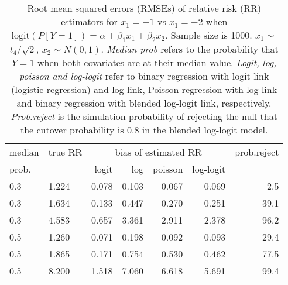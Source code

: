 \documentclass[12pt,a4paper]{article}
\begin{document}
\begin{table}[H] 
\small\sf\centering 
\caption{Root mean squared errors (RMSEs) of relative risk (RR) estimators for $x_1=-1$ vs $x_1=-2$ when $\mbox{logit}(P[Y=1])=\alpha+\beta_1 x_1 + \beta_2 x_2$. Sample size is 1000. $x_1 \sim $$t_4/\sqrt{2}$, $x_2 \sim N(0,1)$. {\it Median prob} refers to the probability that $Y=1$ when both covariates are at their median value. {\it Logit, log, poisson and log-logit} refer to binary regression with logit link (logistic regression) and log link, Poisson regression with log link and binary regression with blended log-logit link, respectively. {\it Prob.reject} is the simulation probability of rejecting the null that the cutover probability is $0.8$ in the blended log-logit model.} 
\begin{tabular}{llrrrrr} 
\toprule 
median & true RR & \multicolumn{4}{c}{bias of estimated RR} & prob.reject \\ 
prob. & & logit & log & poisson & log-logit  & \\ \midrule 
0.3 & 1.224 & 0.078 & 0.103 & 0.067 & 0.069 &  2.5 \\  
0.3 & 1.634 & 0.133 & 0.447 & 0.270 & 0.251 & 39.1 \\  
0.3 & 4.583 & 0.657 & 3.361 & 2.911 & 2.378 & 96.2 \\  
0.5 & 1.260 & 0.071 & 0.198 & 0.092 & 0.093 & 29.4 \\  
0.5 & 1.865 & 0.171 & 0.754 & 0.530 & 0.462 & 77.5 \\  
0.5 & 8.200 & 1.518 & 7.060 & 6.618 & 5.691 & 99.4 \\  
\bottomrule 
\end{tabular} 
\end{table} 
\end{document}
